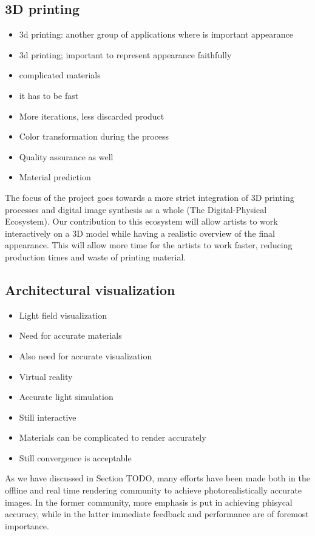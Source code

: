\subsection{3D printing}

\begin{itemize}
\item 3d printing: another group of applications where is important appearance
\item 3d printing; important to represent appearance faithfully
\item complicated materials
\item it has to be fast
\item More iterations, less discarded product
\item Color transformation during the process
\item Quality assurance as well
\item Material prediction 
\end{itemize}

The focus of the project goes towards a more strict integration of 3D printing processes and
digital image synthesis as a whole (The Digital-Physical Ecosystem). Our contribution to this
ecosystem will allow artists to work interactively on a 3D model while having a realistic overview
of the final appearance. This will allow more time for the artists to work faster, reducing
production times and waste of printing material.


\subsection{Architectural visualization}

\begin{itemize}
\item Light field visualization
\item Need for accurate materials
\item Also need for accurate visualization
\item Virtual reality
\item Accurate light simulation
\item Still interactive
\item Materials can be complicated to render accurately
\item Still convergence is acceptable
\end{itemize}

As we have discussed in Section TODO, many efforts have been made both in the offline and real time rendering community to achieve photorealistically accurate images. In the former community, more emphasis is put in achieving phisycal accuracy, while in the latter immediate feedback and performance are of foremost importance.

